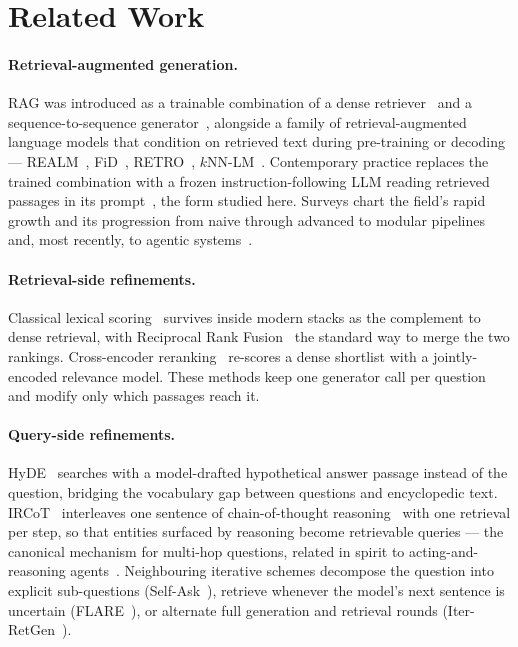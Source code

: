 \section{Related Work}
\label{sec:related}

\paragraph{Retrieval-augmented generation.}
RAG was introduced as a trainable combination of a dense
retriever~\cite{karpukhin2020dpr} and a sequence-to-sequence
generator~\cite{lewis2020rag}, alongside a family of retrieval-augmented
language models that condition on retrieved text during pre-training or
decoding --- REALM~\cite{guu2020realm}, FiD~\cite{izacard2021fid},
RETRO~\cite{borgeaud2022retro}, $k$NN-LM~\cite{khandelwal2020knnlm}.
Contemporary practice replaces the trained combination with a frozen
instruction-following LLM reading retrieved passages in its
prompt~\cite{ram2023incontext,shi2024replug}, the form studied here. Surveys chart the field's rapid growth
and its progression from naive through advanced to modular
pipelines~\cite{gao2023ragsurvey} and, most recently, to agentic
systems~\cite{singh2025agenticrag}.

\paragraph{Retrieval-side refinements.}
Classical lexical scoring~\cite{robertson2009bm25} survives inside modern
stacks as the complement to dense retrieval, with Reciprocal Rank
Fusion~\cite{cormack2009rrf} the standard way to merge the two rankings.
Cross-encoder reranking~\cite{nogueira2019passage} re-scores a dense
shortlist with a jointly-encoded relevance model. These methods keep one
generator call per question and modify only which passages reach it.

\paragraph{Query-side refinements.}
HyDE~\cite{gao2022hyde} searches with a model-drafted hypothetical answer
passage instead of the question, bridging the vocabulary gap between
questions and encyclopedic text. IRCoT~\cite{trivedi2023ircot} interleaves
one sentence of chain-of-thought reasoning~\cite{wei2022cot} with one
retrieval per step, so that entities surfaced by reasoning become
retrievable queries --- the canonical mechanism for multi-hop questions,
related in spirit to acting-and-reasoning agents~\cite{yao2023react}.
Neighbouring iterative schemes decompose the question into explicit
sub-questions (Self-Ask~\cite{press2023selfask}), retrieve whenever the
model's next sentence is uncertain (FLARE~\cite{jiang2023flare}), or
alternate full generation and retrieval rounds
(Iter-RetGen~\cite{shao2023iterretgen}).

